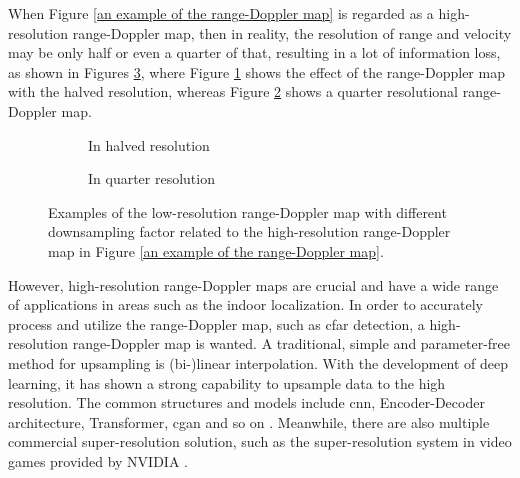 When Figure \ref{an example of the range-Doppler map} is regarded as a high-resolution range-Doppler map, then in reality, the resolution of range and velocity may be only half or even a quarter of that, resulting in a lot of information loss, as shown in Figures \ref{examples of the low resolutional range-Doppler map in different downsampled factor}, where Figure \ref{in halved resolution} shows the effect of the range-Doppler map with the halved resolution, whereas Figure \ref{in quarter resolution} shows a quarter resolutional range-Doppler map.

\begin{figure}
    \centering
    \hspace{-0.4cm}
    \begin{subfigure}{0.5\textwidth}
        \centering
        \caption{In halved resolution}
        \label{in halved resolution}
    \end{subfigure}
    \begin{subfigure}{0.5\textwidth}
        \centering
        \caption{In quarter resolution}
        \label{in quarter resolution}
    \end{subfigure}
    \caption{Examples of the low-resolution range-Doppler map with different downsampling factor related to the high-resolution range-Doppler map in Figure \ref{an example of the range-Doppler map}.}
	\label{examples of the low resolutional range-Doppler map in different downsampled factor}
\end{figure}

However, high-resolution range-Doppler maps are crucial and have a wide range of applications in areas such as the indoor localization. In order to accurately process and utilize the range-Doppler map, such as \gls{cfar} detection, a high-resolution range-Doppler map is wanted. A traditional, simple and parameter-free method for upsampling is (bi-)linear interpolation. With the development of deep learning, it has shown a strong capability to upsample data to the high resolution. The common structures and models include \gls{cnn}, Encoder-Decoder architecture, Transformer, \gls{cgan} and so on \cite{wang_deep_2021}. Meanwhile, there are also multiple commercial super-resolution solution, such as the super-resolution system in video games provided by NVIDIA \cite{watson2020deep}.

